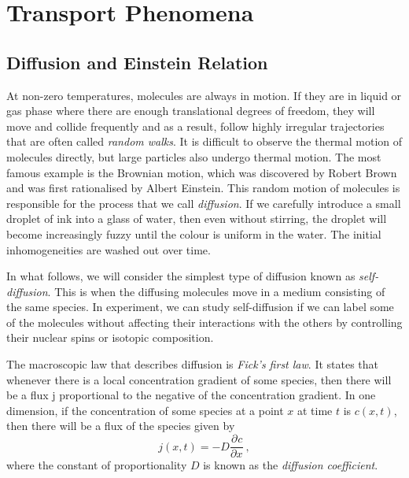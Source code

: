 \documentclass{article}
\theoremstyle{plain}\theoremheaderfont{\normalfont\bfseries}\theorembodyfont{\rmfamily}\theoremseparator{.}\newtheorem*{thm}{Theorem}\newtheorem*{law}{Law}\newtheorem*{pos}{Postulate}
\numberwithin{equation}{section}
\newcommand{\pdv}[3][]{\frac{\partial^{#1} #2}{{\partial #3}^{#1}}}
\newcommand{\vb}[1]{\bm{\mathrm{#1}}}
\begin{document}
    \newpage
    \section{Transport Phenomena}
    \subsection{Diffusion and Einstein Relation}
    At non-zero temperatures, molecules are always in motion. If they are in liquid or gas phase where there are enough translational degrees of freedom, they will move and collide frequently and as a result, follow highly irregular trajectories that are often called \textit{random walks}. It is difficult to observe the thermal motion of molecules directly, but large particles also undergo thermal motion. The most famous example is the Brownian motion, which was discovered by Robert Brown and was first rationalised by Albert Einstein. This random motion of molecules is responsible for the process that we call \textit{diffusion}. If we carefully introduce a small droplet of ink into a glass of water, then even without stirring, the droplet will become increasingly fuzzy until the colour is uniform in the water. The initial inhomogeneities are washed out over time.

    In what follows, we will consider the simplest type of diffusion known as \textit{self-diffusion}. This is when the diffusing molecules move in a medium consisting of the same species. In experiment, we can study self-diffusion if we can label some of the molecules without affecting their interactions with the others by controlling their nuclear spins or isotopic composition.

    The macroscopic law that describes diffusion is \textit{Fick's first law}. It states that whenever there is a local concentration gradient of some species, then there will be a flux \(\vb{j}\) proportional to the negative of the concentration gradient. In one dimension, if the concentration of some species at a point \(x\) at time \(t\) is \(c(x,t)\), then there will be a flux of the species given by
    \begin{equation}
        j(x,t)=-D\pdv{c}{x}\,,
    \end{equation}
    where the constant of proportionality \(D\) is known as the \textit{diffusion coefficient}.
\end{document}
